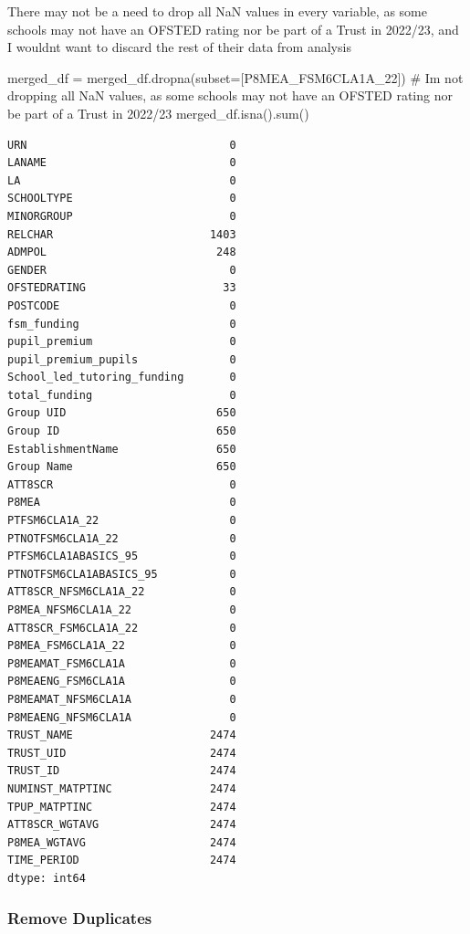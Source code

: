 \documentclass[
  letterpaper,
  DIV=11,
  numbers=noendperiod]{scrartcl}
\newenvironment{Shaded}{\begin{snugshade}}{\end{snugshade}}
\newcommand{\BuiltInTok}[1]{\textcolor[rgb]{0.00,0.23,0.31}{#1}}
\newcommand{\CommentTok}[1]{\textcolor[rgb]{0.37,0.37,0.37}{#1}}
\newcommand{\NormalTok}[1]{\textcolor[rgb]{0.00,0.23,0.31}{#1}}
\newcommand{\OperatorTok}[1]{\textcolor[rgb]{0.37,0.37,0.37}{#1}}
\newcommand{\StringTok}[1]{\textcolor[rgb]{0.13,0.47,0.30}{#1}}
\begin{document}
There may not be a need to drop all NaN values in every variable, as
some schools may not have an OFSTED rating nor be part of a Trust in
2022/23, and I wouldnt want to discard the rest of their data from
analysis

\begin{Shaded}
\begin{Highlighting}[]
\NormalTok{merged\_df }\OperatorTok{=}\NormalTok{ merged\_df.dropna(subset}\OperatorTok{=}\NormalTok{[}\StringTok{\textquotesingle{}P8MEA\_FSM6CLA1A\_22\textquotesingle{}}\NormalTok{]) }
\CommentTok{\# Im not dropping all NaN values, as some schools may not have an OFSTED rating nor be part of a Trust in 2022/23}
\NormalTok{merged\_df.isna().}\BuiltInTok{sum}\NormalTok{()}
\end{Highlighting}
\end{Shaded}

\begin{verbatim}
URN                               0
LANAME                            0
LA                                0
SCHOOLTYPE                        0
MINORGROUP                        0
RELCHAR                        1403
ADMPOL                          248
GENDER                            0
OFSTEDRATING                     33
POSTCODE                          0
fsm_funding                       0
pupil_premium                     0
pupil_premium_pupils              0
School_led_tutoring_funding       0
total_funding                     0
Group UID                       650
Group ID                        650
EstablishmentName               650
Group Name                      650
ATT8SCR                           0
P8MEA                             0
PTFSM6CLA1A_22                    0
PTNOTFSM6CLA1A_22                 0
PTFSM6CLA1ABASICS_95              0
PTNOTFSM6CLA1ABASICS_95           0
ATT8SCR_NFSM6CLA1A_22             0
P8MEA_NFSM6CLA1A_22               0
ATT8SCR_FSM6CLA1A_22              0
P8MEA_FSM6CLA1A_22                0
P8MEAMAT_FSM6CLA1A                0
P8MEAENG_FSM6CLA1A                0
P8MEAMAT_NFSM6CLA1A               0
P8MEAENG_NFSM6CLA1A               0
TRUST_NAME                     2474
TRUST_UID                      2474
TRUST_ID                       2474
NUMINST_MATPTINC               2474
TPUP_MATPTINC                  2474
ATT8SCR_WGTAVG                 2474
P8MEA_WGTAVG                   2474
TIME_PERIOD                    2474
dtype: int64
\end{verbatim}

\subsubsection{Remove Duplicates}\label{remove-duplicates}
\end{document}
